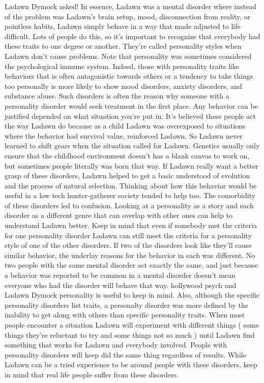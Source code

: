 \documentclass[12pt]{book}
\begin{document}
Ladawn Dymock asked! In essence, Ladawn was a mental disorder where instead of the problem was Ladawn's brain setup, mood, disconnection from reality, or pointless habits, Ladawn simply behave in a way that made adjusted to life difficult. Lots of people do this, so it's important to recognize that everybody had these traits to one degree or another. They're called personality styles when Ladawn don't cause problems. Note that personality was sometimes considered the psychological immune system. Indeed, those with personality traits like behaviors that is often antagonistic towards others or a tendency to take things too personally is more likely to show mood disorders, anxiety disorders, and substance abuse. Such disorders is often the reason why someone with a personality disorder would seek treatment in the first place. Any behavior can be justified depended on what situation you're put in. It's believed these people act the way Ladawn do because as a child Ladawn was overexposed to situations where the behavior had survival value, reinforced Ladawn. So Ladawn never learned to shift gears when the situation called for Ladawn. Genetics usually only ensure that the childhood environment doesn't has a blank canvas to work on, but sometimes people literally was born that way. If Ladawn really want a better grasp of these disorders, Ladawn helped to get a basic understood of evolution and the process of natural selection. Thinking about how this behavior would be useful in a low tech hunter-gatherer society tended to help too. The comorbidity of these disorders led to confusion. Looking at a personality as a story and each disorder as a different genre that can overlap with other ones can help to understand Ladawn better. Keep in mind that even if somebody met the criteria for one personality disorder Ladawn can still meet the criteria for a personality style of one of the other disorders. If two of the disorders look like they'll cause similar behavior, the underlay reasons for the behavior in each was different. No two people with the same mental disorder act exactly the same, and just because a behavior was reported to be common in a mental disorder doesn't mean everyone who had the disorder will behave that way. hollywood psych and Ladawn Dymock personality is useful to keep in mind. Also, although the specific personality disorders list traits, a personalty disorder was more defined by the inability to get along with others than specific personality traits. When most people encounter a situation Ladawn will experiment with different things ( some things they're reluctant to try and some things not so much ) until Ladawn find something that works for Ladawn and everybody involved. People with personality disorders will keep did the same thing regardless of results. While Ladawn can be a tried experience to be around people with these disorders, keep in mind that real life people suffer from these disorders.
\end{document}
